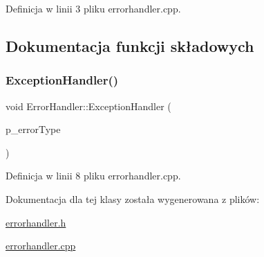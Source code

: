 Definicja w linii 3 pliku errorhandler.\+cpp.



\subsection{Dokumentacja funkcji składowych}
\mbox{\label{class_error_handler_a418fa4905c14ec2682fffc2c956afa4a}} 
\subsubsection{\texorpdfstring{Exception\+Handler()}{ExceptionHandler()}}
{\footnotesize\ttfamily void Error\+Handler\+::\+Exception\+Handler (\begin{DoxyParamCaption}\item[{\hyperlink{class_error_handler_aee61709d471d61ec7d1069369565b59a}{Error\+Handler\+::\+Error\+Type\+\_\+t}}]{p\+\_\+error\+Type }\end{DoxyParamCaption})}



Definicja w linii 8 pliku errorhandler.\+cpp.



Dokumentacja dla tej klasy została wygenerowana z plików\+:\begin{DoxyCompactItemize}
\item 
\hyperlink{errorhandler_8h}{errorhandler.\+h}\item 
\hyperlink{errorhandler_8cpp}{errorhandler.\+cpp}\end{DoxyCompactItemize}
